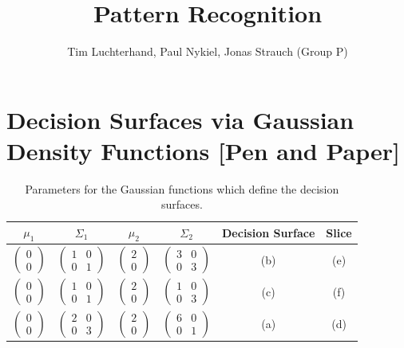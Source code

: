\documentclass[DIN, pagenumber=false, fontsize=11pt, parskip=half]{scrartcl}
\title{Pattern Recognition}
\author{Tim Luchterhand, Paul Nykiel, Jonas Strauch (Group P)}
\begin{document}
    \maketitle
    \section{Decision Surfaces via Gaussian Density Functions [Pen and Paper]}
    \begin{table}[H]
        \centering
        \begin{tabular}{cccccc}
            \toprule
            $\mu_1$ & $\Sigma_1$ & $\mu_2$ & $\Sigma_2$ & Decision Surface & Slice \\
            \midrule
            $\begin{pmatrix} 0 \\ 0 \end{pmatrix}$ & $\begin{pmatrix} 1 & 0 \\ 0 & 1 \end{pmatrix}$ &
                $\begin{pmatrix} 2 \\ 0 \end{pmatrix}$ & $\begin{pmatrix} 3 & 0 \\ 0 & 3 \end{pmatrix}$ &
                (b) & (e)  \\
            $\begin{pmatrix} 0 \\ 0 \end{pmatrix}$ & $\begin{pmatrix} 1 & 0 \\ 0 & 1 \end{pmatrix}$ &
                $\begin{pmatrix} 2 \\ 0 \end{pmatrix}$ & $\begin{pmatrix} 1 & 0 \\ 0 & 3 \end{pmatrix}$ &
                (c) & (f) \\
            $\begin{pmatrix} 0 \\ 0 \end{pmatrix}$ & $\begin{pmatrix} 2 & 0 \\ 0 & 3 \end{pmatrix}$ &
                $\begin{pmatrix} 2 \\ 0 \end{pmatrix}$ & $\begin{pmatrix} 6 & 0 \\ 0 & 1 \end{pmatrix}$ &
                (a) & (d) \\
            \bottomrule
        \end{tabular}
        \caption{Parameters for the Gaussian functions which define the decision surfaces.}
    \end{table}
    
\end{document}
